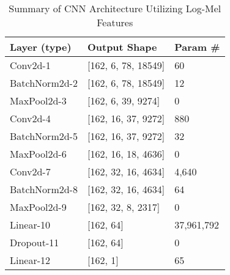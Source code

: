 
\begin{table}[!t]
    \centering
    \caption{Summary of CNN Architecture Utilizing Log-Mel Features}
    \label{table:cnn}
    \begin{tabular}{lll}
        \toprule
        \textbf{Layer (type)} & \textbf{Output Shape} & \textbf{Param \#} \\
        \midrule
        Conv2d-1 & [162, 6, 78, 18549] & 60 \\
        BatchNorm2d-2 & [162, 6, 78, 18549] & 12 \\
        MaxPool2d-3 & [162, 6, 39, 9274] & 0 \\
        \addlinespace
        Conv2d-4 & [162, 16, 37, 9272] & 880 \\
        BatchNorm2d-5 & [162, 16, 37, 9272] & 32 \\
        MaxPool2d-6 & [162, 16, 18, 4636] & 0 \\
        \addlinespace
        Conv2d-7 & [162, 32, 16, 4634] & 4,640 \\
        BatchNorm2d-8 & [162, 32, 16, 4634] & 64 \\
        MaxPool2d-9 & [162, 32, 8, 2317] & 0 \\
        \addlinespace
        Linear-10 & [162, 64] & 37,961,792 \\
        Dropout-11 & [162, 64] & 0 \\
        Linear-12 & [162, 1] & 65 \\
        \bottomrule
    \end{tabular}
\end{table}